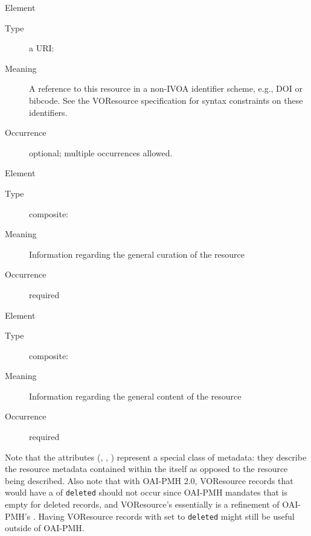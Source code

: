 \documentclass[11pt,a4paper]{ivoa}
\begin{document}
\begin{generated}
\begin{bigdescription}
\begin{description}
\end{description}
\item[Element \xmlel{altIdentifier}]
\begin{description}
\item[Type] a URI: 
\item[Meaning]
                  A reference to this resource in a non-IVOA identifier
                  scheme, e.g., DOI or bibcode.  See the VOResource
                  specification for syntax constraints on these identifiers.

\item[Occurrence] optional; multiple occurrences allowed.

\end{description}
\item[Element \xmlel{curation}]
\begin{description}
\item[Type] composite: 
\item[Meaning]
               Information regarding the general curation of the resource

\item[Occurrence] required

\end{description}
\item[Element \xmlel{content}]
\begin{description}
\item[Type] composite: 
\item[Meaning]
               Information regarding the general content of the resource

\item[Occurrence] required

\end{description}


\end{bigdescription}\endgroup

\endgroup
\end{generated}


Note that the  attributes (,
, ) represent a special class of
metadata: they describe the resource metadata contained
within the  itself as opposed to the resource being
described.  Also note that with OAI-PMH 2.0, VOResource records that
would have a  of \verb|deleted| should not occur since
OAI-PMH mandates that  is empty for deleted
records, and VOResource's  essentially is a refinement of
OAI-PMH's .  Having VOResource records with 
set to \verb|deleted| might still be useful outside of OAI-PMH.
\end{document}
